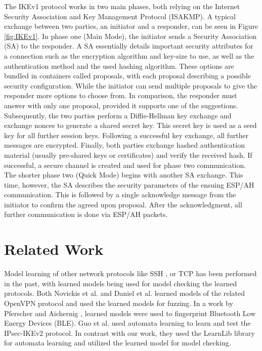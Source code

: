 \documentclass[runningheads]{llncs}
\begin{document}
The IKEv1 protocol works in two main phases, both relying on the Internet Security Association and Key Management Protocol (ISAKMP). A typical exchange between two parties, an initiator and a responder, can be seen in Figure \ref{fig:IKEv1}. In phase one (Main Mode), the initiator sends a Security Association (SA) to the responder. A SA essentially details important security attributes for a connection such as the encryption algorithm and key-size to use, as well as the authentication method and the used hashing algorithm. These options are bundled in containers called proposals, with each proposal describing a possible security configuration. While the initiator can send multiple proposals to give the responder more options to choose from. In comparison, the responder must answer with only one proposal, provided it supports one of the suggestions. Subsequently, the two parties perform a Diffie-Hellman key exchange and exchange nonces to generate a shared secret key. This secret key is used as a seed key for all further session keys. Following a successful key exchange, all further messages are encrypted. Finally, both parties exchange hashed authentication material (usually pre-shared keys or certificates) and verify the received hash. If successful, a secure channel is created and used for phase two communication.
The shorter phase two (Quick Mode) begins with another SA exchange. This time, however, the SA describes the security parameters of the ensuing ESP/AH communication. This is followed by a single acknowledge message from the initiator to confirm the agreed upon proposal. After the acknowledgment, all further communication is done via ESP/AH packets. 


\section{Related Work} \label{chap:3} %
Model learning of other network protocols like SSH \cite{fiteruau2017model}, or TCP \cite{fiteruau2016combining} has been performed in the past, with learned models being used for model checking the learned protocols. Both Novickis et al. \cite{novickis2016protocol} and Daniel et al. \cite{daniel2018inferring} learned models of the related OpenVPN protocol \cite{novickis2016protocol} and used the learned models for fuzzing. In a work by Pferscher and Aichernig \cite{pferscher2021fingerprinting}, learned models were used to fingerprint Bluetooth Low Energy Devices (BLE). Guo et al. \cite{guo2019model} used automata learning to learn and test the IPsec-IKEv2 protocol. In contrast with our work, they used the LearnLib library for automata learning and utilized the learned model for model checking.
\end{document}
